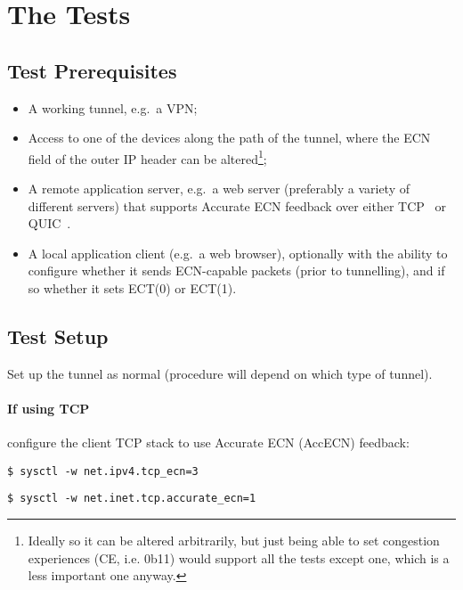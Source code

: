 \section{The Tests}\label{ecn-encap-test_Test}

\subsection{Test Prerequisites}\label{ecn-encap-test_Prereq}

\begin{itemize}[nosep]
	\item A working tunnel, e.g.\ a VPN;
	\item Access to one of the devices along the path of the tunnel, where the ECN field of the outer IP header can be altered\footnote{Ideally so it can be altered arbitrarily, but just being able to set congestion experiences (CE, i.e. 0b11) would support all the tests except one, which is a less important one anyway.};
	\item A remote application server, e.g.\ a web server (preferably a variety of different servers) that supports Accurate ECN feedback over either TCP~\cite{Briscoe14d:accecn_ID} or QUIC~\cite{Iyengar21:QUIC}.
	\item A local application client (e.g.\ a web browser), optionally with the ability to configure whether it sends ECN-capable packets (prior to tunnelling), and if so whether it sets ECT(0) or ECT(1). 
\end{itemize}
\subsection{Test Setup}\label{ecn-encap-test_Setup}

Set up the tunnel as normal (procedure will depend on which type of tunnel).

\paragraph{If using TCP} configure the client TCP stack to use Accurate ECN (AccECN) feedback: 
\begin{description}[style=nextline, nosep]
	\item[Linux:] \texttt{\$ sysctl -w net.ipv4.tcp\_ecn=3}
	\item[MacOS:] \texttt{\$ sysctl -w net.inet.tcp.accurate\_ecn=1}
\end{description}

